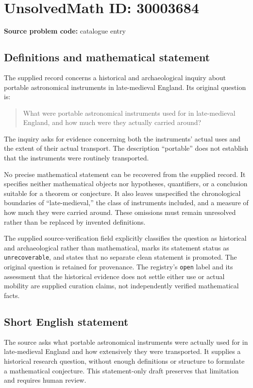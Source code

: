 \documentclass[11pt]{article}
\begin{document}
\section*{UnsolvedMath ID: 30003684}
\textbf{Source problem code:} catalogue entry
\subsection{Definitions and mathematical statement}
The supplied record concerns a historical and archaeological inquiry about portable astronomical instruments in late-medieval England. Its original question is:
\begin{quote}
What were portable astronomical instruments used for in late-medieval England, and how much were they actually carried around?
\end{quote}
The inquiry asks for evidence concerning both the instruments' actual uses and the extent of their actual transport. The description ``portable'' does not establish that the instruments were routinely transported.

No precise mathematical statement can be recovered from the supplied record. It specifies neither mathematical objects nor hypotheses, quantifiers, or a conclusion suitable for a theorem or conjecture. It also leaves unspecified the chronological boundaries of ``late-medieval,'' the class of instruments included, and a measure of how much they were carried around. These omissions must remain unresolved rather than be replaced by invented definitions.

The supplied source-verification field explicitly classifies the question as historical and archaeological rather than mathematical, marks its statement status as \texttt{unrecoverable}, and states that no separate clean statement is promoted. The original question is retained for provenance. The registry's \texttt{open} label and its assessment that the historical evidence does not settle either use or actual mobility are supplied curation claims, not independently verified mathematical facts.
\subsection{Short English statement}
The source asks what portable astronomical instruments were actually used for in late-medieval England and how extensively they were transported. It supplies a historical research question, without enough definitions or structure to formulate a mathematical conjecture. This statement-only draft preserves that limitation and requires human review.
\end{document}
